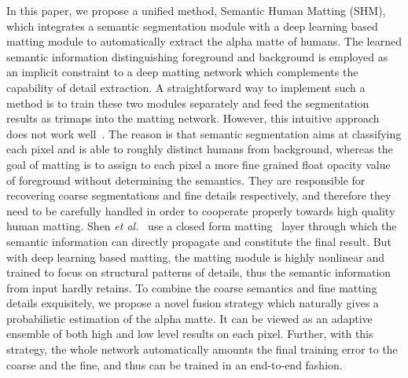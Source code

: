In this paper, we propose a unified method, Semantic Human Matting (SHM), which integrates a semantic segmentation module with a deep learning based matting module to automatically extract the alpha matte of humans.
The learned semantic information distinguishing foreground and background is employed as an implicit constraint
to a deep matting network which complements the capability of detail extraction.
A straightforward way to implement such a method is to train these two modules separately and feed the segmentation results as trimaps into the matting network.
However, this intuitive approach does not work well~\cite{shen2016deep}.
The reason is that 
semantic segmentation aims at classifying each pixel and is able to roughly distinct humans from background, whereas the goal of matting is to assign to each pixel a more fine grained float opacity value of foreground without determining the semantics.
They are responsible for recovering coarse segmentations and fine details respectively, and therefore they need to be carefully handled in order to cooperate properly towards high quality human matting.
Shen \emph{et al.}~\cite{shen2016deep} use a closed form matting~\cite{levin2008closed} layer through which the semantic information can directly propagate and constitute the final result.
But with deep learning based matting, the matting module is highly nonlinear and trained to focus on structural patterns of details, thus the semantic information from input hardly retains.
To combine the coarse semantics and fine matting details exquisitely, we propose a novel fusion strategy which naturally gives a probabilistic estimation of the alpha matte.
It can be viewed as an adaptive ensemble of both high and low level results on each pixel.
Further, with this strategy, the whole network automatically amounts the final training error to the coarse and the fine, and thus can be trained in an end-to-end fashion.








